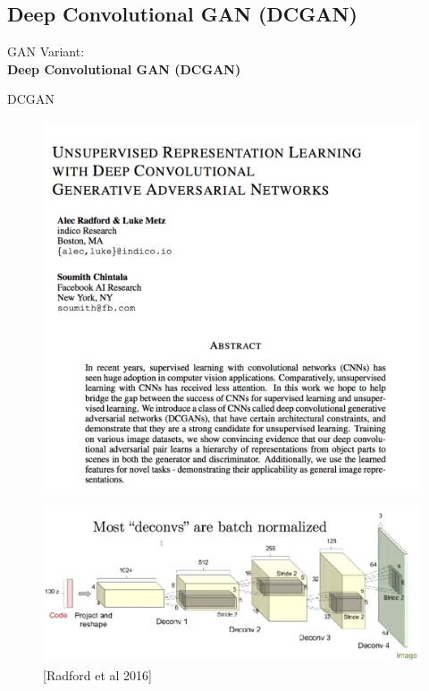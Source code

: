 \subsection{Deep Convolutional GAN (DCGAN)}
\begin{frame}{}
    \LARGE GAN Variant: \\[1.5ex] \textbf{Deep Convolutional GAN (DCGAN)}
\end{frame}

\begin{frame}[allowframebreaks]{DCGAN}
    \begin{figure}
        \centering
        \includegraphics[height=0.9\textheight,keepaspectratio]{images/gan/dcgan-paper.png}
    \end{figure}

    \framebreak

    \begin{figure}
        \centering
        \includegraphics[width=1.05\textwidth,keepaspectratio]{images/gan/dcgan-architecture.png}
        \small [Radford et al 2016]
    \end{figure}


\end{frame}
